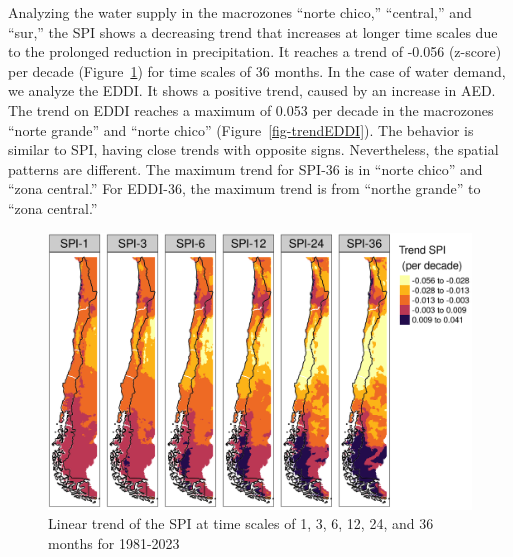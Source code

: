 \documentclass[
  number,
  preprint,
  3p]{elsarticle}
\begin{document}
Analyzing the water supply in the macrozones ``norte chico,''
``central,'' and ``sur,'' the SPI shows a decreasing trend that
increases at longer time scales due to the prolonged reduction in
precipitation. It reaches a trend of -0.056 (z-score) per decade
(Figure~\ref{fig-trendSPI}) for time scales of 36 months. In the case of
water demand, we analyze the EDDI. It shows a positive trend, caused by
an increase in AED. The trend on EDDI reaches a maximum of 0.053 per
decade in the macrozones ``norte grande'' and ``norte chico''
(Figure~\ref{fig-trendEDDI}). The behavior is similar to SPI, having
close trends with opposite signs. Nevertheless, the spatial patterns are
different. The maximum trend for SPI-36 is in ``norte chico'' and ``zona
central.'' For EDDI-36, the maximum trend is from ``northe grande'' to
``zona central.''

\begin{figure}[!ht]

{\centering \includegraphics{../output/figs/trend_raster_SPI_1981-2023.png}

}

\caption{\label{fig-trendSPI}Linear trend of the SPI at time scales of
1, 3, 6, 12, 24, and 36 months for 1981-2023}

\end{figure}
\end{document}
